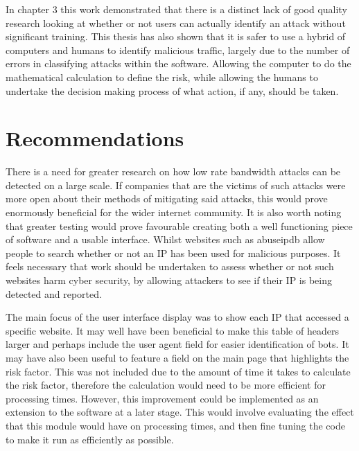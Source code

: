 In chapter 3 this work demonstrated that there is a distinct lack of good quality research looking at whether or not users can actually identify an attack without significant training. This thesis has also shown that it is safer to use a hybrid of computers and humans to identify malicious traffic, largely due to the number of errors in classifying attacks within the software. Allowing the computer to do the mathematical calculation to define the risk, while allowing the humans to undertake the decision making process of what action, if any, should be taken.






\section{Recommendations}

There is a need for greater research  on how low rate bandwidth attacks can be detected on a large scale. If companies that are the victims of such attacks were more open about their methods of mitigating said attacks, this would prove enormously beneficial for the wider internet community. It is also worth noting that greater testing would prove favourable creating both a well functioning piece of software and a usable interface. Whilst websites such as abuseipdb allow people to search whether or not an IP has been used for malicious purposes. It feels necessary that work should be undertaken to assess whether or not such websites harm cyber security, by allowing attackers to see if their IP is being detected and reported.

The main focus of the user interface display was to show each IP that accessed a specific website. It may well have been beneficial to make this table of headers larger and perhaps include the user agent field for easier identification of bots. It may have also been useful to feature a field on the main page that highlights the risk factor. This was not included due to the amount of time it takes to calculate the risk factor, therefore the calculation would need to be more efficient for processing times. However, this improvement could be implemented as an extension to the software at a later stage. This would involve evaluating the effect that this module would have on processing times, and then fine tuning the code to make it run as efficiently as possible.
